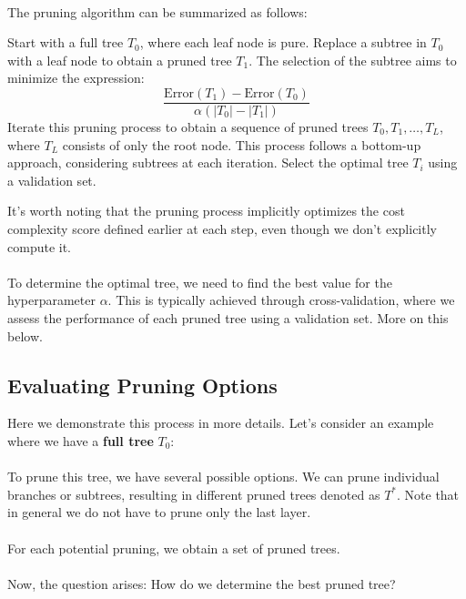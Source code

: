 \documentclass[10pt,a4paper]{report}
\begin{document}
\paragraph{}The pruning algorithm can be summarized as follows:
\begin{algorithm}[H]
\begin{algorithmic}[1]
   \State Start with a full tree $T_0$, where each leaf node is pure.
   \State Replace a subtree in $T_0$ with a leaf node to obtain a pruned tree $T_1$. The selection of the subtree aims to minimize the expression:\newline $$\frac{\textrm{Error}(T_1)-\textrm{Error}(T_0)}{\alpha(|T_0|-|T_1|)}$$
	\State Iterate this pruning process to obtain a sequence of pruned trees $T_0, T_1,\dots, T_L$, where $T_L$ consists of only the root node. This process follows a bottom-up approach, considering subtrees at each iteration.
	\State Select the optimal tree $T_i$ using a validation set.
\end{algorithmic}
\end{algorithm}
It's worth noting that the pruning process implicitly optimizes the cost complexity score defined earlier at each step, even though we don't explicitly compute it.
\paragraph{}To determine the optimal tree, we need to find the best value for the hyperparameter $\alpha$. This is typically achieved through cross-validation, where we assess the performance of each pruned tree using a validation set. More on this below. 
\subsection{Evaluating Pruning Options}Here we demonstrate this process in more details. Let's consider an example where we have a \textbf{full tree} $T_0$:\\
\\
To prune this tree, we have several possible options. We can prune individual branches or subtrees, resulting in different pruned trees denoted as $T^*$. Note that in general we do not have to prune only the last layer.\\
\\
For each potential pruning, we obtain a set of pruned trees.\\
\\
Now, the question arises: How do we determine the best pruned tree?
\end{document}
